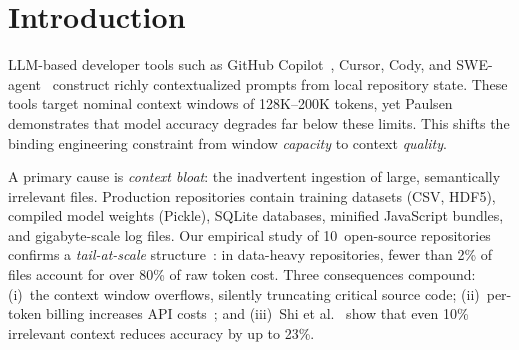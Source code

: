 \documentclass[conference]{IEEEtran}
\begin{document}
\section{Introduction}

LLM-based developer tools such as GitHub Copilot~\cite{copilot},
Cursor, Cody, and SWE-agent~\cite{sweagent} construct richly
contextualized prompts from local repository state. These tools target
nominal context windows of 128K--200K tokens, yet
Paulsen~\cite{paulsen2025} demonstrates that model accuracy degrades
far below these limits. This shifts the binding engineering constraint
from window \emph{capacity} to context \emph{quality}.

A primary cause is \textit{context bloat}: the inadvertent ingestion
of large, semantically irrelevant files. Production repositories
contain training datasets (CSV, HDF5), compiled model weights (Pickle),
SQLite databases, minified JavaScript bundles, and gigabyte-scale log
files. Our empirical study of 10~open-source repositories confirms a
\emph{tail-at-scale} structure~\cite{tailscale}: in data-heavy
repositories, fewer than 2\% of files account for over 80\% of raw
token cost. Three consequences compound: (i)~the context window
overflows, silently truncating critical source code; (ii)~per-token
billing increases API costs~\cite{copilotbilling}; and (iii)~Shi et
al.~\cite{shi2023} show that even 10\% irrelevant context reduces
accuracy by up to 23\%.
\end{document}
